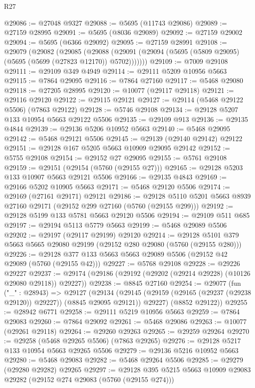 \begin{lexlean}{R27}
\begin{coremodule}
@29086 := @27048 @9327
@29088 := @5695 (@11743 @29086)
@29089 := @27159 @28995
@29091 := @5695 (@8036 @29089)
@29092 := @27159 @29002
@29094 := @5695 (@6366 @29092)
@29095 := @27159 @28991
@29108 := @29079
    (@29082
      (@29085
        (@29088 (@29091 (@29094 (@5695 (@5809 @29095) (@5695 (@5699 (@27823 @12170)) @5702)))))))
@29109 := @7009 @29108
@29111 := @29109 @349 @4949
@29114 := @29111 @5209 @10956 @5663
@29115 := @7864 @29095
@29116 := @7864 @27160
@29117 := @5468 @29080
@29118 := @27205 @28995
@29120 := @10077 (@29117 @29118)
@29121 := @29116 @29120
@29122 := @29115 @29121
@29127 := @29114 (@5468 @29122 @5506) (@7863 @29122)
@29128 := @5746 @29108
@29134 := @29128 @5207 @133 @10954 @5663 @29122 @5506
@29135 := @29109 @913
@29136 := @29135 @4844
@29139 := @29136 @5206 @10952 @5663
@29140 := @5468 @29095
@29142 := @5468 @29121 @5506
@29145 := @29139 (@29140 @29142) @29122
@29151 := @29128 @167 @5205 @5663 @10909 @29095 @29142
@29152 := @5755 @29108
@29154 := @29152 @27 @29095
@29155 := @5761 @29108
@29159 := @29151 (@29154 (@5760 (@29155 @27)))
@29165 := @29128 @5203 @133 @10907 @5663 @29121 @5506
@29166 := @29135 @4843
@29169 := @29166 @5202 @10905 @5663
@29171 := @5468 @29120 @5506
@29174 := @29169 (@27161 @29171) @29121
@29186 := @29128 @5110 @5201 @5663 @8939 @27160 @29171 (@29152 @299 @27160 (@5760 (@29155 @299)))
@29192 := @29128 @5199 @133 @5781 @5663 @29120 @5506
@29194 := @29109 @511 @685
@29197 := @29194 @5113 @5779 @5663
@29199 := @5468 @29089 @5506
@29202 := @29197 (@29117 @29199) @29120
@29214 := @29128 @5101 @379 @5663 @5665 @29080 @29199 (@29152 @280 @29080 (@5760 (@29155 @280)))
@29226 := @29128 @377 @133 @5663 @5663 @29089 @5506 (@29152 @42 @29089 (@5760 (@29155 @42)))
@29227 := @5768 @29108
@29228 := @29226 @29227
@29237 := @29174 (@29186 (@29192 (@29202 (@29214 @29228) (@10126 @29080 @29118)) @29227))
@29238 := @8845 @27160
@29254 := @29077
    (fun ("_" : @28943) =>
    @29127
      (@29134
        (@29145 (@29159 (@29165 (@29237 (@29238 @29120)) @29227)) (@8845 @29095 @29121))
        @29227)
      (@8852 @29122))
@29255 := @28942 @6771
@29258 := @29111 @5219 @10956 @5663
@29259 := @7864 @29083
@29260 := @7864 @29092
@29261 := @5468 @29086
@29263 := @10077 (@29261 @29118)
@29264 := @29260 @29263
@29265 := @29259 @29264
@29270 := @29258 (@5468 @29265 @5506) (@7863 @29265)
@29276 := @29128 @5217 @133 @10954 @5663 @29265 @5506
@29279 := @29136 @5216 @10952 @5663
@29280 := @5468 @29083
@29282 := @5468 @29264 @5506
@29285 := @29279 (@29280 @29282) @29265
@29297 := @29128 @395 @5215 @5663 @10909 @29083 @29282 (@29152 @274 @29083 (@5760 (@29155 @274)))

\end{coremodule}
\end{lexlean}
